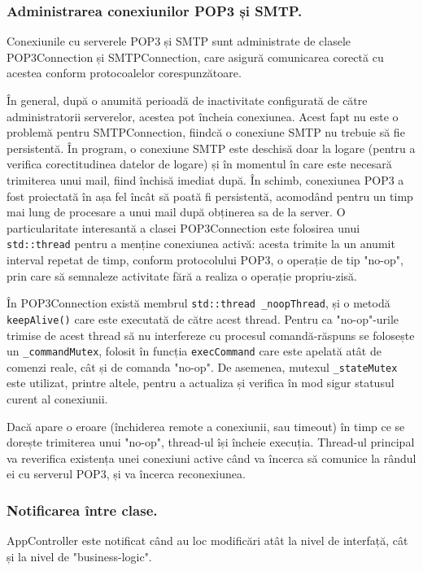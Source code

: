 \documentclass[runningheads]{llncs}
\begin{document}
\subsubsection{Administrarea conexiunilor POP3 și SMTP.}

Conexiunile cu serverele POP3 și SMTP sunt administrate de clasele POP3Connection și SMTPConnection, care asigură comunicarea corectă cu acestea conform protocoalelor corespunzătoare. 

În general, după o anumită perioadă de inactivitate configurată de către administratorii serverelor, acestea pot încheia conexiunea. Acest fapt nu este o problemă pentru SMTPConnection, fiindcă o conexiune SMTP nu trebuie să fie persistentă. În program, o conexiune SMTP este deschisă doar la logare (pentru a verifica corectitudinea datelor de logare) și în momentul în care este necesară trimiterea unui mail, fiind închisă imediat după. În schimb, conexiunea POP3 a fost proiectată în așa fel încât să poată fi persistentă, acomodând pentru un timp mai lung de procesare a unui mail după obținerea sa de la server. O particularitate interesantă a clasei POP3Connection este folosirea unui \texttt{std::thread} pentru a menține conexiunea activă: acesta trimite la un anumit interval repetat de timp, conform protocolului POP3, o operație de tip "no-op", prin care să semnaleze activitate fără a realiza o operație propriu-zisă.

În POP3Connection există membrul \texttt{std::thread \_noopThread}, și o metodă \texttt{keepAlive()} care este executată de către acest thread. Pentru ca "no-op"-urile trimise de acest thread să nu interfereze cu procesul comandă-răspuns se folosește un \texttt{\_commandMutex}, folosit în funcția \texttt{execCommand} care este apelată atât de comenzi reale, cât și de comanda "no-op". De asemenea, mutexul \texttt{\_stateMutex} este utilizat, printre altele, pentru a actualiza și verifica în mod sigur statusul curent al conexiunii.

Dacă apare o eroare (închiderea remote a conexiunii, sau timeout) în timp ce se dorește trimiterea unui "no-op", thread-ul își încheie execuția. Thread-ul principal va reverifica existența unei conexiuni active când va încerca să comunice la rândul ei cu serverul POP3, și va încerca reconexiunea.


\subsubsection{Notificarea între clase.} AppController este notificat când au loc modificări atât la nivel de interfață, cât și la nivel de "business-logic".
\end{document}
